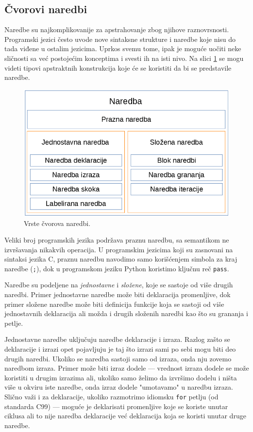 \subsection{Čvorovi naredbi}
\label{subsec:MyASTStatementNodes}

Naredbe su najkomplikovanije za apstrahovanje zbog njihove raznovrsnosti. Programski jezici često uvode nove sintaksne strukture i naredbe koje nisu do tada viđene u ostalim jezicima. Uprkos svemu tome, ipak je moguće uočiti neke sličnosti sa već postojećim konceptima i svesti ih na isti nivo. Na slici \ref{fig:StatementNodes} se mogu videti tipovi apstraktnih konstrukcija koje će se koristiti da bi se predstavile naredbe.

\begin{figure}[h!]
\centering
\includegraphics[scale=0.5]{images/statement_nodes.png}
\caption{Vrste čvorova naredbi.}
\label{fig:StatementNodes}
\end{figure}

Veliki broj programskih jezika podržava praznu naredbu, sa semantikom ne izvršavanja nikakvih operacija. U programskim jezicima koji su zasnovani na sintaksi jezika C, praznu naredbu navodimo samo korišćenjem simbola za kraj naredbe (\texttt{;}), dok u programskom jeziku Python koristimo ključnu reč \texttt{pass}. 

Naredbe su podeljene na \emph{jednostavne} i \emph{složene}, koje se sastoje od više drugih naredbi. Primer jednostavne naredbe može biti deklaracija promenljive, dok primer složene naredbe može biti definicija funkcije koja se sastoji od više jednostavnih deklaracija ali možda i drugih složenih naredbi kao što su grananja i petlje.

Jednostavne naredbe uključuju naredbe deklaracije i izraza. Razlog zašto se deklaracije i izrazi opet pojavljuju je taj što izrazi sami po sebi mogu biti deo drugih naredbi. Ukoliko se naredba sastoji samo od izraza, onda nju zovemo naredbom izraza. Primer može biti izraz dodele --- vrednost izraza dodele se može koristiti u drugim izrazima ali, ukoliko samo želimo da izvršimo dodelu i ništa više u okviru iste naredbe, onda izraz dodele "umotavamo" u naredbu izraza. Slično važi i za deklaracije, ukoliko razmotrimo idiomsku \texttt{for} petlju (od standarda C99) --- moguće je deklarisati promenljive koje se koriste unutar ciklusa ali to nije naredba deklaracije već deklaracija koja se koristi unutar druge naredbe. 

